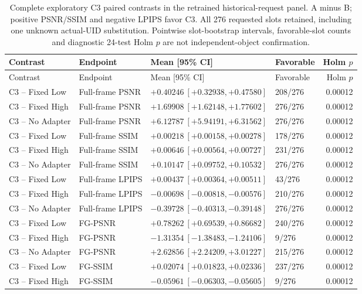 \documentclass[11pt]{article}
\begin{document}
\begingroup\scriptsize
\begin{longtable}{p{3.0cm}p{2.7cm}p{5.0cm}lr}
\caption{Complete exploratory C3 paired contrasts in the retrained historical-request panel. A minus B; positive PSNR/SSIM and negative LPIPS favor C3. All 276 requested slots retained, including one unknown actual-UID substitution. Pointwise slot-bootstrap intervals, favorable-slot counts and diagnostic 24-test Holm $p$ are not independent-object confirmation.}\label{tab:supp-original276}\\
\toprule Contrast & Endpoint & Mean [95\% CI] & Favorable & Holm $p$ \\
\midrule\endfirsthead
\toprule Contrast & Endpoint & Mean [95\% CI] & Favorable & Holm $p$ \\
\midrule\endhead

C3 -- Fixed Low & Full-frame PSNR & $+0.40246\ [+0.32938,+0.47580]$ & 208/276 & 0.00012 \\
C3 -- Fixed High & Full-frame PSNR & $+1.69908\ [+1.62148,+1.77602]$ & 276/276 & 0.00012 \\
C3 -- No Adapter & Full-frame PSNR & $+6.12787\ [+5.94191,+6.31562]$ & 276/276 & 0.00012 \\
C3 -- Fixed Low & Full-frame SSIM & $+0.00218\ [+0.00158,+0.00278]$ & 178/276 & 0.00012 \\
C3 -- Fixed High & Full-frame SSIM & $+0.00646\ [+0.00564,+0.00727]$ & 231/276 & 0.00012 \\
C3 -- No Adapter & Full-frame SSIM & $+0.10147\ [+0.09752,+0.10532]$ & 276/276 & 0.00012 \\
C3 -- Fixed Low & Full-frame LPIPS & $+0.00437\ [+0.00364,+0.00511]$ & 43/276 & 0.00012 \\
C3 -- Fixed High & Full-frame LPIPS & $-0.00698\ [-0.00818,-0.00576]$ & 210/276 & 0.00012 \\
C3 -- No Adapter & Full-frame LPIPS & $-0.39728\ [-0.40313,-0.39148]$ & 276/276 & 0.00012 \\
C3 -- Fixed Low & FG-PSNR & $+0.78262\ [+0.69539,+0.86682]$ & 240/276 & 0.00012 \\
C3 -- Fixed High & FG-PSNR & $-1.31354\ [-1.38483,-1.24106]$ & 9/276 & 0.00012 \\
C3 -- No Adapter & FG-PSNR & $+2.62856\ [+2.24209,+3.01227]$ & 215/276 & 0.00012 \\
C3 -- Fixed Low & FG-SSIM & $+0.02074\ [+0.01823,+0.02336]$ & 237/276 & 0.00012 \\
C3 -- Fixed High & FG-SSIM & $-0.05961\ [-0.06303,-0.05605]$ & 9/276 & 0.00012 \\

\end{longtable}
\end{document}
